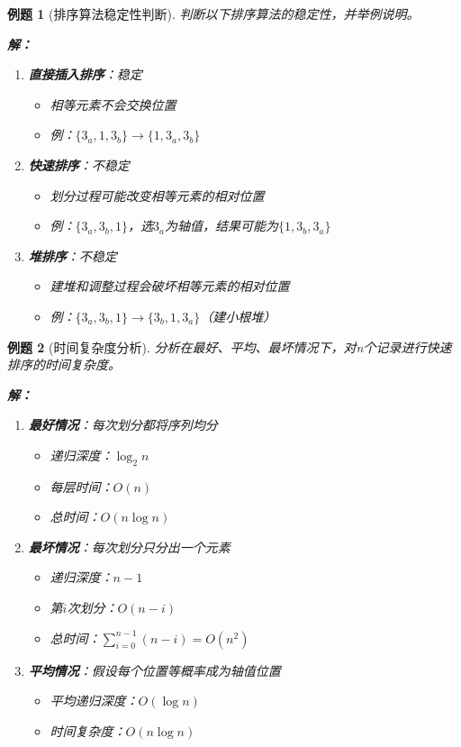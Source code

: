\documentclass[12pt,a4paper]{amsart}
\newtheorem{example}{例题}[section]
\begin{document}
\begin{example}[排序算法稳定性判断]
判断以下排序算法的稳定性，并举例说明。

\textbf{解：}
\begin{enumerate}
\item \textbf{直接插入排序}：稳定
    \begin{itemize}
    \item 相等元素不会交换位置
    \item 例：$\{3_a, 1, 3_b\} \rightarrow \{1, 3_a, 3_b\}$
    \end{itemize}

\item \textbf{快速排序}：不稳定
    \begin{itemize}
    \item 划分过程可能改变相等元素的相对位置
    \item 例：$\{3_a, 3_b, 1\}$，选$3_a$为轴值，结果可能为$\{1, 3_b, 3_a\}$
    \end{itemize}

\item \textbf{堆排序}：不稳定
    \begin{itemize}
    \item 建堆和调整过程会破坏相等元素的相对位置
    \item 例：$\{3_a, 3_b, 1\} \rightarrow \{3_b, 1, 3_a\}$（建小根堆）
    \end{itemize}
\end{enumerate}
\end{example}

\begin{example}[时间复杂度分析]
分析在最好、平均、最坏情况下，对n个记录进行快速排序的时间复杂度。

\textbf{解：}
\begin{enumerate}
\item \textbf{最好情况}：每次划分都将序列均分
    \begin{itemize}
    \item 递归深度：$\log_2 n$
    \item 每层时间：$O(n)$
    \item 总时间：$O(n\log n)$
    \end{itemize}

\item \textbf{最坏情况}：每次划分只分出一个元素
    \begin{itemize}
    \item 递归深度：$n-1$
    \item 第$i$次划分：$O(n-i)$
    \item 总时间：$\sum_{i=0}^{n-1}(n-i) = O(n^2)$
    \end{itemize}

\item \textbf{平均情况}：假设每个位置等概率成为轴值位置
    \begin{itemize}
    \item 平均递归深度：$O(\log n)$
    \item 时间复杂度：$O(n\log n)$
    \end{itemize}
\end{enumerate}
\end{example}
\end{document}
